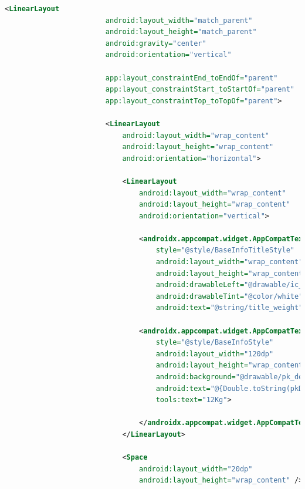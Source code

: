 \documentclass[a4paper, 12pt]{article}
\begin{document}
\begin{lstlisting}[caption={Pokemon Detail Layout.}, label={layout:pk_detail}, language=XML]
                    <LinearLayout
                        android:layout_width="match_parent"
                        android:layout_height="match_parent"
                        android:gravity="center"
                        android:orientation="vertical"
    
                        app:layout_constraintEnd_toEndOf="parent"
                        app:layout_constraintStart_toStartOf="parent"
                        app:layout_constraintTop_toTopOf="parent">
    
                        <LinearLayout
                            android:layout_width="wrap_content"
                            android:layout_height="wrap_content"
                            android:orientation="horizontal">
    
                            <LinearLayout
                                android:layout_width="wrap_content"
                                android:layout_height="wrap_content"
                                android:orientation="vertical">
    
                                <androidx.appcompat.widget.AppCompatTextView
                                    style="@style/BaseInfoTitleStyle"
                                    android:layout_width="wrap_content"
                                    android:layout_height="wrap_content"
                                    android:drawableLeft="@drawable/ic_weight"
                                    android:drawableTint="@color/white"
                                    android:text="@string/title_weight" />
    
                                <androidx.appcompat.widget.AppCompatTextView
                                    style="@style/BaseInfoStyle"
                                    android:layout_width="120dp"
                                    android:layout_height="wrap_content"
                                    android:background="@drawable/pk_detail_general_text"
                                    android:text="@{Double.toString(pkDetail.weight)}"
                                    tools:text="12Kg">
    
                                </androidx.appcompat.widget.AppCompatTextView>
                            </LinearLayout>
    
                            <Space
                                android:layout_width="20dp"
                                android:layout_height="wrap_content" />
    

\end{lstlisting}
\end{document}
